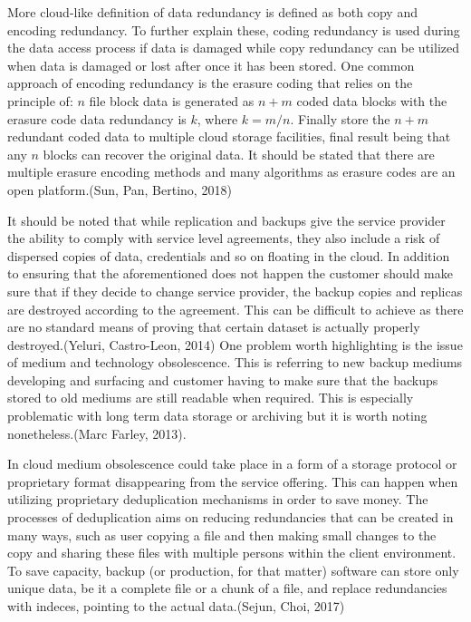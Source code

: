\documentclass{article}
\begin{document}
\par
More cloud-like definition of data redundancy is defined as both copy and encoding redundancy. To further explain these, coding redundancy is used during the data access process if data is damaged while copy redundancy can be utilized when data is damaged or lost after once it has been stored. One common approach of encoding redundancy is the erasure coding that relies on the principle of: $n$ file block data is generated as $n + m$ coded data blocks with the erasure code data redundancy is $k$, where $k = m/n$. Finally store the $n + m$ redundant coded data to multiple cloud storage facilities, final result being that any $n$ blocks can recover the original data. It should be stated that there are multiple erasure encoding methods and many algorithms as erasure codes are an open platform.(Sun, Pan, Bertino, 2018)
\par
It should be noted that while replication and backups give the service provider the ability to comply with service level agreements, they also include a risk of dispersed copies of data, credentials and so on floating in the cloud. In addition to ensuring that the aforementioned does not happen the customer should make sure that if they decide to change service provider, the backup copies and replicas are destroyed according to the agreement. This can be difficult to achieve as there are no standard means of proving that certain dataset is actually properly destroyed.(Yeluri, Castro-Leon, 2014)
One problem worth highlighting is the issue of medium and technology obsolescence. This is referring to new backup mediums developing and surfacing and customer having to make sure that the backups stored to old mediums are still readable when required. This is especially problematic with long term data storage or archiving but it is worth noting nonetheless.(Marc Farley, 2013).
\par
In cloud medium obsolescence could take place in a form of a storage protocol or proprietary format disappearing from the service offering. This can happen when utilizing proprietary deduplication mechanisms in order to save money. The processes of deduplication aims on reducing redundancies that can be created in many ways, such as user copying a file and then making small changes to the copy and sharing these files with multiple persons within the client environment. To save capacity, backup (or production, for that matter) software can store only unique data, be it a complete file or a chunk of a file, and replace redundancies with indeces, pointing to the actual data.(Sejun, Choi, 2017)
\end{document}

